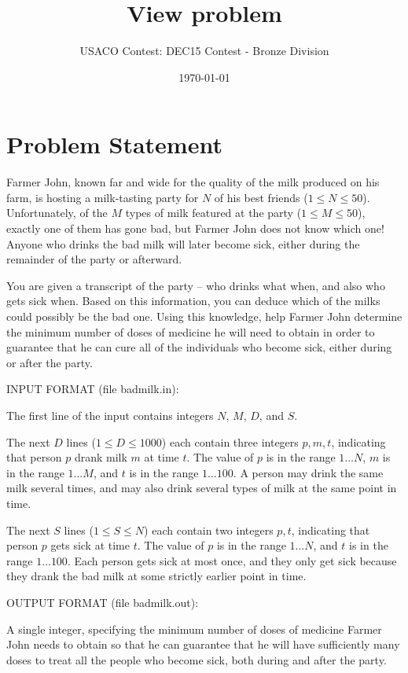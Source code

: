 \documentclass[12pt]{article}
\title{View problem}
\author{USACO Contest: DEC15 Contest - Bronze Division}
\date{\today}
\begin{document}
\maketitle

\section*{Problem Statement}

Farmer John, known far and wide for the quality of the milk produced on his farm, is hosting
a milk-tasting party for $N$ of his best friends ($1 \leq N \leq 50$). 
Unfortunately, of  the $M$ types of milk featured at the party
($1 \leq M \leq 50$), exactly one of them has gone bad, but Farmer John does not
know which one!  Anyone who drinks the bad milk will later become sick, either
during the remainder of the party or afterward.  

You are given a transcript of the party -- who drinks what when,
and also who gets sick when.  Based on this information, you can
deduce which of the milks could possibly be the bad one.  Using this
knowledge, help Farmer John determine the minimum number of doses of
medicine he will need to obtain in order to guarantee that he can cure
all of the individuals who become sick, either during or after the
party.

INPUT FORMAT (file badmilk.in):

The first line of the input contains integers $N$, $M$, $D$, and $S$.

The next $D$ lines ($1 \leq D \leq 1000$) each contain three
integers $p, m, t$, indicating that person $p$ drank milk $m$ at time
$t$. The value of $p$ is in the range $1 \ldots N$, $m$ is in the
range $1 \ldots M$, and $t$ is in the range $1 \ldots 100$.  A person
may drink the same milk several times, and may also drink several
types of milk at the same point in time.

The next $S$ lines ($1 \leq S \leq N$) each contain two integers
$p, t$, indicating that person $p$ gets sick at time $t$. The value of
$p$ is in the range $1 \ldots N$, and $t$ is in the range $1 \ldots
100$.  Each person gets sick at most once, and they only get sick
because they drank the bad milk at some strictly earlier point in
time.


OUTPUT FORMAT (file
badmilk.out):

A single integer, specifying the minimum number of doses of medicine
Farmer John needs to obtain so that he can guarantee that he will have
sufficiently many doses to treat all the people who become sick, both
during and after the party.
\end{document}

